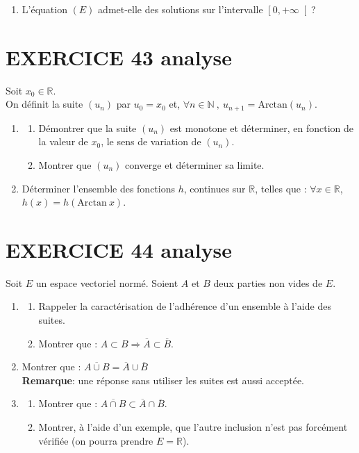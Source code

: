\documentclass[10pt,oneside]{article}
\begin{document}
\begin{flushleft}
\begin{enumerate}
\item L'équation $(E)$ admet-elle des solutions sur l'intervalle $\left[ 0,+\infty\right[ $?
\end{enumerate}


\section*{EXERCICE 43 \:analyse }

 

Soit $x_0 \in \mathbb{R}$.\\
On définit la suite $(u_n)$ par $u_0=x_0$ et, $\forall n\in\mathbb{N}\:,\: u_{n+1}=\mathrm{Arctan}(u_n)$.
\begin{enumerate}
\item 
\begin{enumerate}

\item
 Démontrer que la suite $(u_n)$ est monotone et déterminer, en fonction de la valeur de $x_0$, le sens de variation de $(u_n)$.
\item Montrer que $(u_n)$ converge et déterminer sa limite.
\end{enumerate}
\item Déterminer l'ensemble des fonctions $h$, continues sur $\mathbb{R}$, telles que : $\forall x \in \mathbb{R}$, $h(x)=h(\mathrm{Arctan}\: x)$.
\end{enumerate}

\medskip

\section*{EXERCICE 44 \:analyse }
 

Soit $E$ un espace vectoriel normé. Soient $A$ et $B$ deux parties non vides de $E$. 
\begin{enumerate}
\item 
\begin{enumerate} 
\item Rappeler la caractérisation de l'adhérence d'un ensemble à l'aide des suites. 
\item Montrer que : $A \subset B \Longrightarrow \overline{A} \subset \overline{B}$.
\end{enumerate}
\item Montrer que : $\overline{A \cup B}=\overline{A} \cup \overline{B}$ \\
\textbf{ Remarque}: une réponse sans utiliser les suites est aussi acceptée.
\item \begin{enumerate}
\item Montrer que : $\overline{A \cap B} \subset \overline{A} \cap \overline{B}$.
\item Montrer, à l'aide d'un exemple, que l'autre inclusion n'est pas forcément vérifiée (on pourra prendre $E=\mathbb{R}$).
\end{enumerate}
\end{enumerate}



\end{flushleft}
\end{document}
